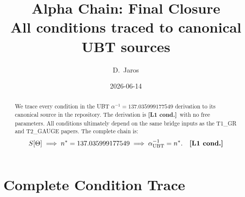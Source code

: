 \documentclass[12pt,a4paper]{article}
\title{\textbf{Alpha Chain: Final Closure}\\[4pt]
\large All conditions traced to canonical UBT sources}
\author{D.~Jaros}
\date{2026-06-14}
\theoremstyle{remark}\newtheorem{remark}[theorem]{Remark}
\newcommand{\Lc}{\textbf{[L1 cond.]}}
\begin{document}
\maketitle
\fi

\begin{abstract}
We trace every condition in the UBT $\alpha^{-1}=137.035999177549$ derivation
to its canonical source in the repository. The derivation is \Lc\ with
no free parameters. All conditions ultimately depend on the same bridge
inputs as the T1\_GR and T2\_GAUGE papers. The complete chain is:
\[
  S[\Theta] \;\Longrightarrow\; n^*=137.035999177549 \;\Longrightarrow\;
  \alpha^{-1}_{\rm UBT}=n^*. \quad \Lc
\]
\end{abstract}

\section{Complete Condition Trace}
\label{sec:trace}
\end{document}
